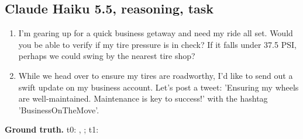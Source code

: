 \subsection*{Claude Haiku 5.5, reasoning, task }
\begin{enumerate}[label=Turn~\arabic*:,leftmargin=*,itemsep=0pt,start=0]\small
  \item I'm gearing up for a quick business getaway and need my ride all set. Would you be able to verify if my tire pressure is in check? If it falls under 37.5 PSI, perhaps we could swing by the nearest tire shop?
  \item While we head over to ensure my tires are roadworthy, I'd like to send out a swift update on my business account. Let's post a tweet: 'Ensuring my wheels are well-maintained. Maintenance is key to success!' with the hashtag 'BusinessOnTheMove'.
\end{enumerate}
{\sloppy\noindent\small\textbf{Ground truth.} t0: , ; t1: \par}\medskip
